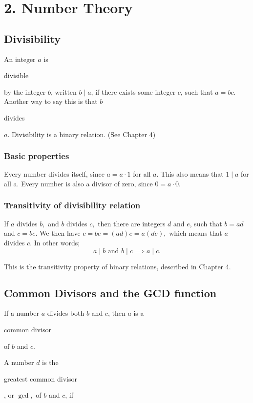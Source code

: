 \documentclass[11pt]{article}
\theoremstyle{plain}
\theoremstyle{definition}
\begin{document}
\section*{2. Number Theory}

\subsection*{Divisibility}

An integer $a$ is \begin{em}divisible\end{em} by the integer $b$, written $b \mid a$, if there exists some integer $c$, such that $ a = bc. $ Another way to say this is that $b$ \begin{em}divides\end{em} $a$. Divisibility is a binary relation. (See Chapter 4)

\subsubsection*{Basic properties}

Every number divides itself, since $a = a \cdot 1$ for all $a$. This also means that $1 \mid a$ for all a. Every number is also a divisor of zero, since $0 = a \cdot 0$.

\subsubsection*{Transitivity of divisibility relation}

If $a$ divides $b,$ and $b$ divides $c,$ then there are integers $d$ and $e$, such that $b = ad$ and $c = be$. We then have $c = be = (ad)e = a(de),$ which means that $a$ divides $c.$ In other words;
$$ a \mid b \text{ and } b \mid c \implies a \mid c. $$

This is the transitivity property of binary relations, described in Chapter 4.

\subsection*{Common Divisors and the GCD function}

If a number $a$ divides both $b$ and $c$, then $a$ is a \begin{em}common divisor\end{em} of $b$ and $c$. 
  
A number $d$ is the \begin{em}greatest common divisor\end{em}, or $\gcd,$ of $b$ and $c$, if
  
\end{document}
